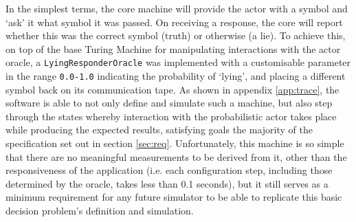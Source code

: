 \documentclass[12pt]{article}
\begin{document}
		In the simplest terms, the core machine will provide the actor with a symbol and `ask' it what symbol it was passed. On receiving a response, the core will report whether this was the correct symbol (truth) or otherwise (a lie).
		To achieve this, on top of the base Turing Machine for manipulating interactions with the actor oracle, a \texttt{LyingResponderOracle} was implemented with a customisable parameter in the range \texttt{0.0-1.0} indicating the probability of `lying', and placing a different symbol back on its communication tape.
		As shown in appendix \ref{app:trace}, the software is able to not only define and simulate such a machine, but also step through the states whereby interaction with the probabilistic actor takes place while producing the expected results, satisfying goals the majority of the specification set out in section \ref{sec:req}.
		Unfortunately, this machine is so simple that there are no meaningful measurements to be derived from it, other than the responsiveness of the application (i.e. each configuration step, including those determined by the oracle, takes less than 0.1 seconds), but it still serves as a minimum requirement for any future simulator to be able to replicate this basic decision problem's definition and simulation.
\end{document}
